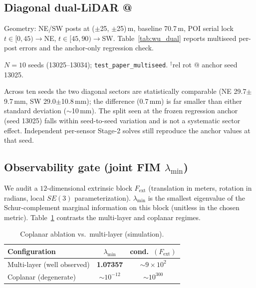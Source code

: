 \subsection{Diagonal dual-LiDAR @ \flightW{}}
Geometry: NE/SW posts at ($\pm$25, $\pm$25)\,m, baseline 70.7\,m, POI serial lock
$t\in[0,45)\to$NE, $t\in[45,90)\to$SW.
Table~\ref{tab:wu_dual} reports multiseed per-post errors and the anchor-only
regression check.

\begin{table}[!t]
  \centering
  \caption{Dual-LiDAR @ 0.5\,Hz (simulation).}
  \label{tab:wu_dual}
  \footnotesize
  \vspace{1mm}

  {\footnotesize $N{=}10$ seeds (13025--13034); \texttt{test\_paper\_multiseed}.
  $^\dagger$rel rot @ anchor seed 13025.}
\end{table}

Across ten seeds the two diagonal sectors are statistically comparable
(NE 29.7$\pm$9.7\,mm, SW 29.0$\pm$10.8\,mm); the difference (0.7\,mm) is far
smaller than either standard deviation ($\sim$10\,mm).
The split seen at the frozen regression anchor (seed 13025) falls within
seed-to-seed variation and is not a systematic sector effect.
Independent per-sensor Stage-2 solves still reproduce the anchor values at that seed.

\subsection{Observability gate (joint FIM $\lambda_{\min}$)}
We audit a $12$-dimensional extrinsic block $F_{\mathrm{ext}}$ (translation in
meters, rotation in radians, local $SE(3)$ parameterization).
$\lambda_{\min}$ is the smallest eigenvalue of the Schur-complement marginal
information on this block (unitless in the chosen metric).
Table~\ref{tab:lambda} contrasts the multi-layer and coplanar regimes.
\begin{table}[t]
  \centering
  \caption{Coplanar ablation vs.\ multi-layer (simulation).}
  \label{tab:lambda}
  \begin{tabular}{lcc}
    \toprule
    Configuration & $\lambda_{\min}$ & cond.\ $(F_{\mathrm{ext}})$ \\
    \midrule
    Multi-layer (well observed) & \textbf{1.07357} & $\sim 9\times 10^2$ \\
    Coplanar (degenerate) & $\sim 10^{-12}$ & $\sim 10^{300}$ \\
    \bottomrule
  \end{tabular}
\end{table}

